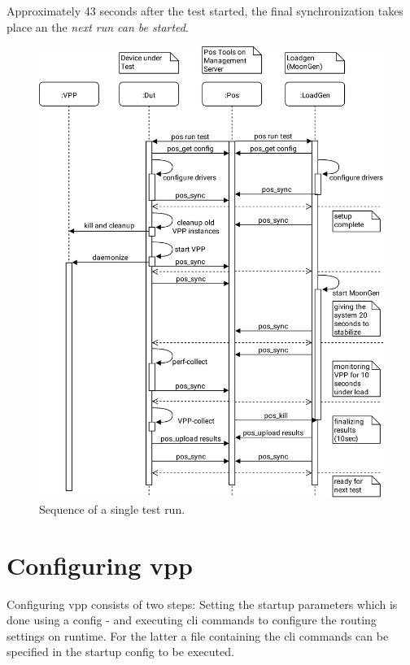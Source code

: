 Approximately 43 seconds after the test started, the final
synchronization takes place an the \textit{next run can be started}.

\begin{figure}[!ht]
\noindent\hspace{0.5mm}\includegraphics[width=\linewidth]{pics/procedure-sequence.png}
\caption{Sequence of a single test run. }
\label{testsequence}
\end{figure}


\section{Configuring \Ac{vpp}}


Configuring \Ac{vpp} consists of two steps: Setting the startup
parameters which is done using a \Ac{config} - and executing \Ac{cli}
commands to configure the routing settings on runtime. For the latter
a file containing the \Ac{cli} commands can be specified in the
startup \Ac{config} to be executed. 

